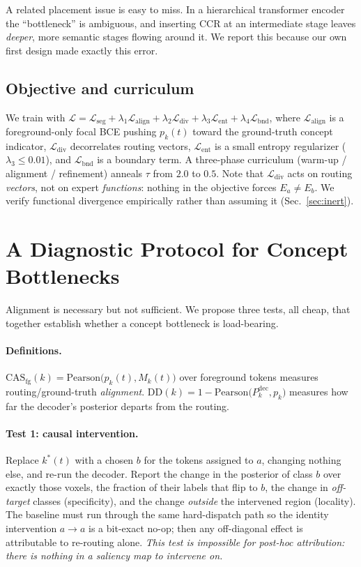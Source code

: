 \documentclass[runningheads]{llncs}
\newcommand{\casfg}{\mathrm{CAS}_{\mathrm{fg}}}
\newcommand{\dd}{\mathrm{DD}}
\begin{document}
A related placement issue is easy to miss. In a hierarchical transformer encoder the ``bottleneck''
is ambiguous, and inserting CCR at an intermediate stage leaves \emph{deeper}, more semantic
stages flowing around it. We report this because our own first design made exactly this error.

\subsection{Objective and curriculum}
We train with $\mathcal{L}=\mathcal{L}_{\text{seg}}+\lambda_1\mathcal{L}_{\text{align}}
+\lambda_2\mathcal{L}_{\text{div}}+\lambda_3\mathcal{L}_{\text{ent}}
+\lambda_4\mathcal{L}_{\text{bnd}}$, where $\mathcal{L}_{\text{align}}$ is a foreground-only
focal BCE pushing $p_k(t)$ toward the ground-truth concept indicator,
$\mathcal{L}_{\text{div}}$ decorrelates routing vectors, $\mathcal{L}_{\text{ent}}$ is a small
entropy regularizer ($\lambda_3\le0.01$), and $\mathcal{L}_{\text{bnd}}$ is a boundary term.
A three-phase curriculum (warm-up / alignment / refinement) anneals $\tau$ from $2.0$ to $0.5$.
Note that $\mathcal{L}_{\text{div}}$ acts on routing \emph{vectors}, not on expert
\emph{functions}: nothing in the objective forces $E_a\neq E_b$. We verify functional
divergence empirically rather than assuming it (Sec.~\ref{sec:inert}).

\section{A Diagnostic Protocol for Concept Bottlenecks}\label{sec:protocol}
Alignment is necessary but not sufficient. We propose three tests, all cheap, that together
establish whether a concept bottleneck is load-bearing.

\paragraph{Definitions.}
$\casfg(k)=\mathrm{Pearson}\big(p_k(t),M_k(t)\big)$ over foreground tokens measures
routing/ground-truth \emph{alignment}. $\dd(k)=1-\mathrm{Pearson}\big(P^{\text{dec}}_k,p_k\big)$
measures how far the decoder's posterior departs from the routing.

\paragraph{Test 1: causal intervention.} Replace $k^\ast(t)$ with a chosen $b$ for the tokens
assigned to $a$, changing nothing else, and re-run the decoder. Report the change in the
posterior of class $b$ over exactly those voxels, the fraction of their labels that flip to
$b$, the change in \emph{off-target} classes (specificity), and the change \emph{outside} the
intervened region (locality). The baseline must run through the same hard-dispatch path so the
identity intervention $a\!\to\!a$ is a bit-exact no-op; then any off-diagonal effect is
attributable to re-routing alone. \emph{This test is impossible for post-hoc attribution:
there is nothing in a saliency map to intervene on.}
\end{document}
